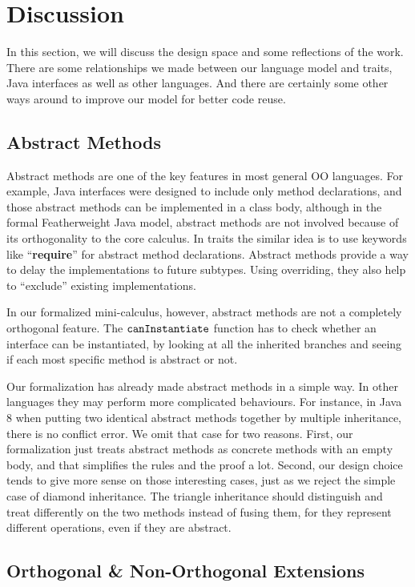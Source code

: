 \section{Discussion}
In this section, we will discuss the design space and some reflections of the work. There are some relationships we made
between our language model and traits, Java interfaces as well as other languages. And there are certainly some other ways
around to improve our model for better code reuse.

\subsection{Abstract Methods}

Abstract methods are one of the key features in most general OO languages. For example, Java interfaces were designed
to include only method declarations, and those abstract methods can be implemented in a class body, although in the formal
Featherweight Java model, abstract methods are not involved because of its orthogonality to the core calculus. In traits the
similar idea is to use keywords like ``\textbf{require}'' for abstract method declarations. Abstract methods provide a way to
delay the implementations to future subtypes. Using overriding, they also help to ``exclude'' existing implementations.

In our formalized mini-calculus, however, abstract methods are not a completely orthogonal feature. The $\texttt{canInstantiate}$ function
has to check whether an interface can be instantiated, by looking at all the inherited branches and seeing if each most specific method
is abstract or not.

Our formalization has already made abstract methods in a simple way. In other languages they may perform more complicated behaviours.
For instance, in Java 8 when putting two identical abstract methods together by multiple inheritance, there is no conflict error. We omit
that case for two reasons. First, our formalization just treats abstract methods as concrete methods with an empty body, and that simplifies
the rules and the proof a lot. Second, our design choice tends to give more sense on those interesting cases, just as we reject the simple case of diamond inheritance. The triangle inheritance should distinguish and treat differently on the two methods instead of fusing them, for they represent different operations, even if they are abstract.

\subsection{Orthogonal \& Non-Orthogonal Extensions}

